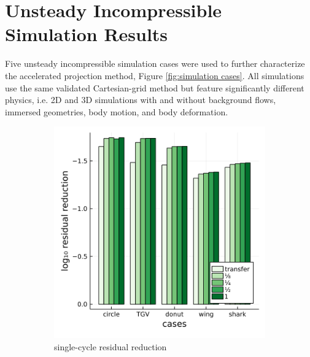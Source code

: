 \documentclass[review]{elsarticle}
\begin{document}
\section{Unsteady Incompressible Simulation Results}

Five unsteady incompressible simulation cases were used to further characterize the accelerated projection method, Figure \ref{fig:simulation cases}. All simulations use the same validated Cartesian-grid method \cite{maertens2015accurate} but feature significantly different physics, i.e. 2D and 3D simulations with and without background flows, immersed geometries, body motion, and body deformation.

\begin{figure}
    \centering
    \begin{subfigure}[b]{0.47\textwidth}
        \centering
        \includegraphics[width=\textwidth]{figures/scaleloss.png}
        \caption{single-cycle residual reduction}
        \label{fig:scaled loss}
    \end{subfigure}
    \hfill
    \begin{subfigure}[b]{0.47\textwidth}
        \centering

\end{subfigure}
\end{figure}
\end{document}

